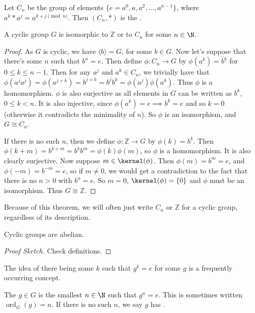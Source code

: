 \documentclass[a4paper]{scrartcl}
\begin{document}
\begin{definition}
	Let $C_n$ be the group of elements $\{e = a^0, a, a^2, \dots, a^{n - 1}\}$, where $a^k * a^j = a^{k + j \pmod{n}}$. Then $(C_n, *)$ is the .
\end{definition}

\begin{theorem}
	A cyclic group $G$ is isomorphic to $\mathbb{Z}$ or to $C_n$ for some $n \in \N$.
\end{theorem}
\begin{proof}
	As $G$ is cyclic, we have $\langle b \rangle = G$, for some $b \in G$.
	Now let's suppose that there's some $n$ such that $b^n = e$. Then define $\phi: C_n \rightarrow G$ by $\phi(a^k) = b^k$ for $0 \leq k \leq n - 1$.
	Then for any $a^j$ and $a^k \in C_n$, we trivially have that $\phi(a^j a^j) = \phi(a^{j + k}) = b^{j + k} = b^j b^k = \phi(a^j) \phi(a^k)$. Thus $\phi$ is a homomorphism.
	$\phi$ is also surjective as all elements in $G$ can be written as $b^k$, $0 \leq k < n$. It is also injective, since $\phi(a^k) = e \implies b^k = e$ and so $k = 0$ (otherwise it contradicts the minimality of $n$). So $\phi$ is an isomorphism, and $G \cong C_n$.

	If there is no such $n$, then we define $\phi : \mathbb{Z} \rightarrow G$ by $\phi(k) = b^k$. Then $\phi(k + m) = b^{k + m} = b^k b^m = \phi(k) \phi(m)$, so $\phi$ is a homomorphism. It is also clearly surjective.
	Now suppose $m \in \kernel(\phi)$. Then $\phi(m) = b^m = e$, and $\phi(-m) = b^{-m} = e$, so if $m \neq 0$, we would get a contradiction to the fact that there is no $n > 0$ with $b^n = e$. So $m = 0$, $\kernel(\phi) = \{0\}$ and $\phi$ must be an isomorphism. Thus $G \cong \mathbb{Z}$.
\end{proof}

Because of this theorem, we will often just write $C_n$ or $\mathbb{Z}$ for a cyclic group, regardless of its description.

\begin{proposition}
	Cyclic groups are abelian.
\end{proposition}
\begin{proof}[Proof Sketch]
	Check definitions.
\end{proof}

The idea of there being some $k$ such that $g^k = e$ for some $g$ is a frequently occurring concept.

\begin{definition}
	The  $g \in G$ is the smallest $n \in \N$ such that $g^n = e$. This is sometimes written $\operatorname{ord}_G(g) = n$. If there is no such $n$, we say $g$ has .
\end{definition}
\end{document}

